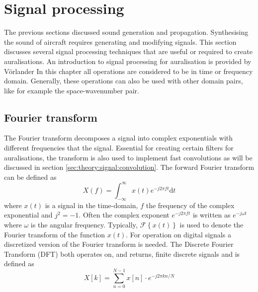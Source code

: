 \section{Signal processing}
The previous sections discussed sound generation and propagation. Synthesising
the sound of aircraft requires generating and modifying signals. This section
discusses several signal processing techniques that are useful or required to
create auralisations. An introduction to signal processing for auralisation is
provided by Vörlander \cite{Vorlander2008} In this chapter all operations are
considered to be in time or frequency domain. Generally, these operations can
also be used with other domain pairs, like for example the space-wavenumber
pair.

\subsection{Fourier transform}
The Fourier transform decomposes a signal into complex exponentials with
different frequencies that the signal. Essential for creating certain filters
for auralisations, the transform is also used to implement fast convolutions as
will be discussed in section \ref{sec:theory:signal:convolution}.
The forward Fourier transform can be defined as
\begin{equation}
 X(f) = \int_{-\infty}^{\infty} x(t) e^{-j 2 \pi f t} \mathrm{d} t
\end{equation}
where $x(t)$ is a signal in the time-domain, $f$ the frequency of the complex exponential and $j^2=-1$.
Often the complex exponent $e^{-j 2 \pi f t}$ is written as $e^{-j \omega t}$ where $\omega$ is the angular frequency.
Typically, $\mathcal{F} \left\{ x(t) \right\}$ is used to denote the Fourier transform of the function $x(t)$.
%
For operation on digital signals a discretized version of the
Fourier transform is needed. The Discrete Fourier Transform (DFT) both operates on, and
returns, finite discrete signals and is defined as
\begin{equation}
 X[k] = \sum_{n=0}^{N-1} x[n] \cdot e^{-j 2\pi k n / N}
\end{equation}
